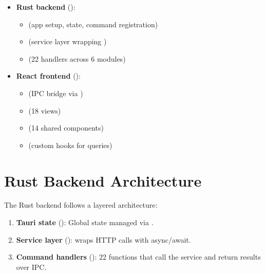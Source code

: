 \begin{itemize}
  \item \textbf{Rust backend} ():
  \begin{itemize}
    \item {} (app setup, state, command registration)
    \item {} (service layer wrapping )
    \item {} (22 handlers across 6 modules)
  \end{itemize}
  \item \textbf{React frontend} ():
  \begin{itemize}
    \item {} (IPC bridge via )
    \item {} (18 views)
    \item {} (14 shared components)
    \item {} (custom hooks for queries)
  \end{itemize}
\end{itemize}

\section{Rust Backend Architecture}
\label{sec:ch17-rust-backend}

The Rust backend follows a layered architecture:

\begin{enumerate}
  \item \textbf{Tauri state} (): Global state managed via .
  \item \textbf{Service layer} ():  wraps  HTTP calls with async/await.
  \item \textbf{Command handlers} (): 22  functions that call the service and return results over IPC.
\end{enumerate}


